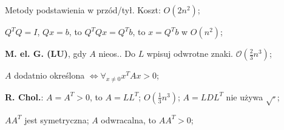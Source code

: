 
\entry
Metody podstawienia w przód/tył. Koszt: $O(2n^2)$;

\entry
$Q^TQ=I$, $Qx=b$, to $Q^TQx=Q^Tb$, to $x=Q^Tb$ w $O(n^2)$;




\entry
\textbf{M. el. G. (LU)}, gdy $A$ nieos..
Do $L$ wpisuj odwrotne znaki.
$\mathcal{O}(\frac{2}{3}n^3)$;

\entry
$A$ dodatnio określona $\iff \forall_{x \neq 0} x^TAx>0$;

\entry
\textbf{R. Chol.}:
$A=A^T>0$,
to
$A=LL^T$;
$O(\frac{1}{3}n^3)$;
$A=LDL^T$
nie używa
$\sqrt{\cdot}$;

\entry
$AA^T$ jest symetryczna;
\entry
$A$ odwracalna, to $AA^T>0$;
